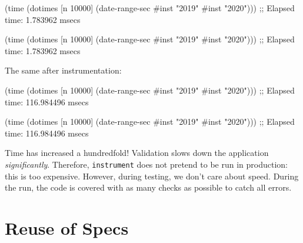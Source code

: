 
\ifx\DEVICETYPE\MOBILE

\begin{english}
  \begin{clojure}
(time
 (dotimes [n 10000]
   (date-range-sec #inst "2019"
                   #inst "2020")))
;; Elapsed time: 1.783962 msecs
  \end{clojure}
\end{english}

\else

\begin{english}
  \begin{clojure}
(time
 (dotimes [n 10000]
   (date-range-sec #inst "2019" #inst "2020")))
;; Elapsed time: 1.783962 msecs
  \end{clojure}
\end{english}

\fi

\noindent
The same after instrumentation:

\ifx\DEVICETYPE\MOBILE

\begin{english}
  \begin{clojure}
(time
 (dotimes [n 10000]
   (date-range-sec #inst "2019"
                   #inst "2020")))
;; Elapsed time: 116.984496 msecs
  \end{clojure}
\end{english}

\else

\begin{english}
  \begin{clojure}
(time
 (dotimes [n 10000]
   (date-range-sec #inst "2019" #inst "2020")))
;; Elapsed time: 116.984496 msecs
  \end{clojure}
\end{english}

\fi


Time has increased a hundredfold! Validation slows down the application \emph{significantly}. Therefore, \verb|instrument| does not pretend to be run in production: this is too expensive. However, during testing, we don't care about speed. During the run, the code is covered with as many checks as possible to catch all errors.

\section{Reuse of Specs}

